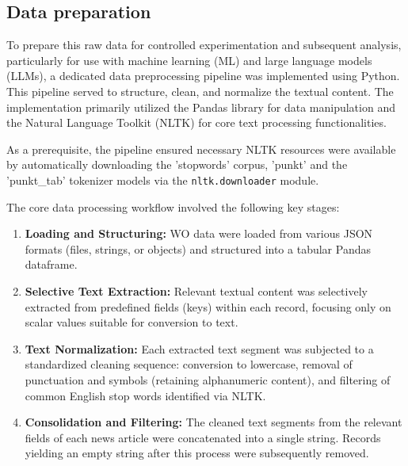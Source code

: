 \subsection{Data preparation}
To prepare this raw data for controlled experimentation and subsequent analysis, particularly for use with machine learning (ML) and large language models (LLMs), a dedicated data preprocessing pipeline was implemented using Python. This pipeline served to structure, clean, and normalize the textual content. The implementation primarily utilized the Pandas library for data manipulation and the Natural Language Toolkit (NLTK) \cite{bird2009nlp} for core text processing functionalities.

As a prerequisite, the pipeline ensured necessary NLTK resources were available by automatically downloading the 'stopwords' corpus, 'punkt' and the 'punkt\_tab' tokenizer models via the \verb|nltk.downloader| module.

The core data processing workflow involved the following key stages:

\begin{enumerate}
    \item \textbf{Loading and Structuring:} WO data were loaded from various JSON formats (files, strings, or objects) and structured into a tabular Pandas dataframe.
    \item \textbf{Selective Text Extraction:} Relevant textual content was selectively extracted from predefined fields (keys) within each record, focusing only on scalar values suitable for conversion to text.
    \item \textbf{Text Normalization:} Each extracted text segment was subjected to a standardized cleaning sequence: conversion to lowercase, removal of punctuation and symbols (retaining alphanumeric content), and filtering of common English stop words identified via NLTK.
    \item \textbf{Consolidation and Filtering:} The cleaned text segments from the relevant fields of each news article were concatenated into a single string. Records yielding an empty string after this process were subsequently removed.
\end{enumerate}

